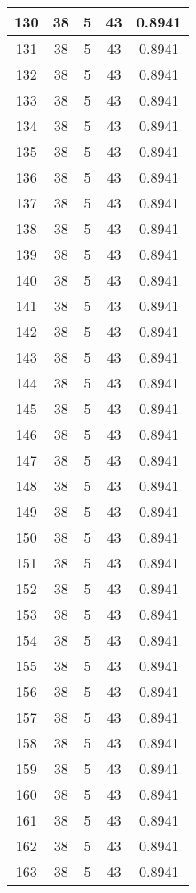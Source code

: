 \documentclass[letterpaper, 12pt]{article}
\begin{document}
\begin{longtable}{|c|c|c|c|c|}
\hline
130 & 38 & 5 & 43 & 0.8941 \\
\hline
131 & 38 & 5 & 43 & 0.8941 \\
\hline
132 & 38 & 5 & 43 & 0.8941 \\
\hline
133 & 38 & 5 & 43 & 0.8941 \\
\hline
134 & 38 & 5 & 43 & 0.8941 \\
\hline
135 & 38 & 5 & 43 & 0.8941 \\
\hline
136 & 38 & 5 & 43 & 0.8941 \\
\hline
137 & 38 & 5 & 43 & 0.8941 \\
\hline
138 & 38 & 5 & 43 & 0.8941 \\
\hline
139 & 38 & 5 & 43 & 0.8941 \\
\hline
140 & 38 & 5 & 43 & 0.8941 \\
\hline
141 & 38 & 5 & 43 & 0.8941 \\
\hline
142 & 38 & 5 & 43 & 0.8941 \\
\hline
143 & 38 & 5 & 43 & 0.8941 \\
\hline
144 & 38 & 5 & 43 & 0.8941 \\
\hline
145 & 38 & 5 & 43 & 0.8941 \\
\hline
146 & 38 & 5 & 43 & 0.8941 \\
\hline
147 & 38 & 5 & 43 & 0.8941 \\
\hline
148 & 38 & 5 & 43 & 0.8941 \\
\hline
149 & 38 & 5 & 43 & 0.8941 \\
\hline
150 & 38 & 5 & 43 & 0.8941 \\
\hline
151 & 38 & 5 & 43 & 0.8941 \\
\hline
152 & 38 & 5 & 43 & 0.8941 \\
\hline
153 & 38 & 5 & 43 & 0.8941 \\
\hline
154 & 38 & 5 & 43 & 0.8941 \\
\hline
155 & 38 & 5 & 43 & 0.8941 \\
\hline
156 & 38 & 5 & 43 & 0.8941 \\
\hline
157 & 38 & 5 & 43 & 0.8941 \\
\hline
158 & 38 & 5 & 43 & 0.8941 \\
\hline
159 & 38 & 5 & 43 & 0.8941 \\
\hline
160 & 38 & 5 & 43 & 0.8941 \\
\hline
161 & 38 & 5 & 43 & 0.8941 \\
\hline
162 & 38 & 5 & 43 & 0.8941 \\
\hline
163 & 38 & 5 & 43 & 0.8941 \\

\end{longtable}
\end{document}
